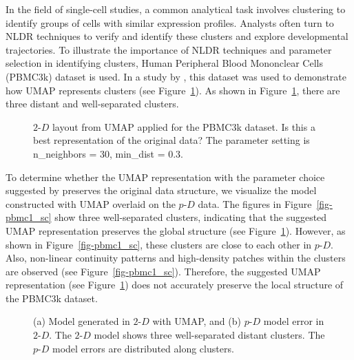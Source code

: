\documentclass[
  12pt]{article}
\newcommand\pD{$p\text{-}D$}
\begin{document}
In the field of single-cell studies, a common analytical task involves
clustering to identify groups of cells with similar expression profiles.
Analysts often turn to NLDR techniques to verify and identify these
clusters and explore developmental trajectories. To illustrate the
importance of NLDR techniques and parameter selection in identifying
clusters, Human Peripheral Blood Mononclear Cells (PBMC3k) dataset
\citep{chen2023} is used. In a study by \citet{chen2023}, this dataset
was used to demonstrate how UMAP represents clusters (see
Figure~\ref{fig-umap-author}). As shown in Figure~\ref{fig-umap-author},
there are three distant and well-separated clusters.

\begin{figure}[H]


\caption{\label{fig-umap-author}\(2\text{-}D\) layout from UMAP applied
for the PBMC3k dataset. Is this a best representation of the original
data? The parameter setting is n\_neighbors = 30, min\_dist = 0.3.}

\end{figure}%

To determine whether the UMAP representation with the parameter choice
suggested by \citet{chen2023} preserves the original data structure, we
visualize the model constructed with UMAP overlaid on the \pD{} data.
The figures in Figure~\ref{fig-pbmc1_sc} show three well-separated
clusters, indicating that the suggested UMAP representation preserves
the global structure (see Figure~\ref{fig-umap-author}). However, as
shown in Figure~\ref{fig-pbmc1_sc}, these clusters are close to each
other in \pD{}. Also, non-linear continuity patterns and high-density
patches within the clusters are observed (see
Figure~\ref{fig-pbmc1_sc}). Therefore, the suggested UMAP representation
(see Figure~\ref{fig-umap-author}) does not accurately preserve the
local structure of the PBMC3k dataset.

\begin{figure}[H]


\caption{\label{fig-model-pbmc-author}(a) Model generated in
\(2\text{-}D\) with UMAP, and (b) \(p\text{-}D\) model error in
\(2\text{-}D\). The \(2\text{-}D\) model shows three well-separated
distant clusters. The \(p\text{-}D\) model errors are distributed along
clusters.}

\end{figure}%
\end{document}
